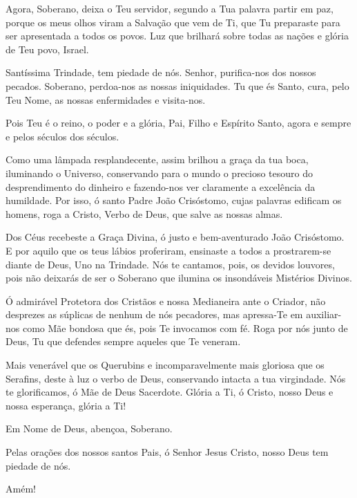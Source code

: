 \documentclass{subfiles}
\begin{document}
Agora, Soberano, deixa o Teu servidor, segundo a Tua palavra partir
em paz, porque os meus olhos viram a Salvação que vem de Ti, que Tu
preparaste para ser apresentada a todos os povos. Luz que brilhará sobre todas
as nações e glória de Teu povo, Israel.

\trisagion{} \thrice{}

\Doxology{}

Santíssima Trindade, tem piedade de nós. Senhor, purifica-nos dos
nossos pecados. Soberano, perdoa-nos as nossas iniquidades. Tu que és Santo,
cura, pelo Teu Nome, as nossas enfermidades e visita-nos.

\mercy{} \thrice{}

\Doxology{}

\ourFather{}

\priest{}Pois Teu é o reino, o poder e a glória, Pai, Filho e Espírito Santo,
agora e sempre e pelos séculos dos séculos.


\reader{}Como uma lâmpada resplandecente, assim brilhou a graça da tua
boca, iluminando o Universo, conservando para o mundo o precioso tesouro
do desprendimento do dinheiro e fazendo-nos ver claramente a excelência da
humildade. Por isso, ó santo Padre João Crisóstomo, cujas palavras edificam
os homens, roga a Cristo, Verbo de Deus, que salve as nossas almas.


\doxology{}

Dos Céus recebeste a Graça Divina, ó justo e bem-aventurado João
Crisóstomo. E por aquilo que os teus lábios proferiram, ensinaste a todos a
prostrarem-se diante de Deus, Uno na Trindade. Nós te cantamos, pois, os
devidos louvores, pois não deixarás de ser o Soberano que ilumina os
insondáveis Mistérios Divinos.

\nowandever{}

Ó admirável Protetora dos Cristãos e nossa Medianeira ante o Criador,
não desprezes as súplicas de nenhum de nós pecadores, mas apressa-Te em
auxiliar-nos como Mãe bondosa que és, pois Te invocamos com fé. Roga por
nós junto de Deus, Tu que defendes sempre aqueles que Te veneram.

\mercy{} 

\Doxology{}

Mais venerável que os Querubins e incomparavelmente mais gloriosa
que os Serafins, deste à luz o verbo de Deus, conservando intacta a tua
virgindade. Nós te glorificamos, ó Mãe de Deus
Sacerdote. Glória a Ti, ó Cristo, nosso Deus e nossa esperança, glória a Ti!

\reader{}\Doxology{}

\mercy{} \thrice{}

Em Nome de Deus, abençoa, Soberano.

\priest{}Pelas orações dos nossos santos Pais, ó Senhor Jesus Cristo, nosso
Deus tem piedade de nós.

\reader{}Amém!
\end{document}

